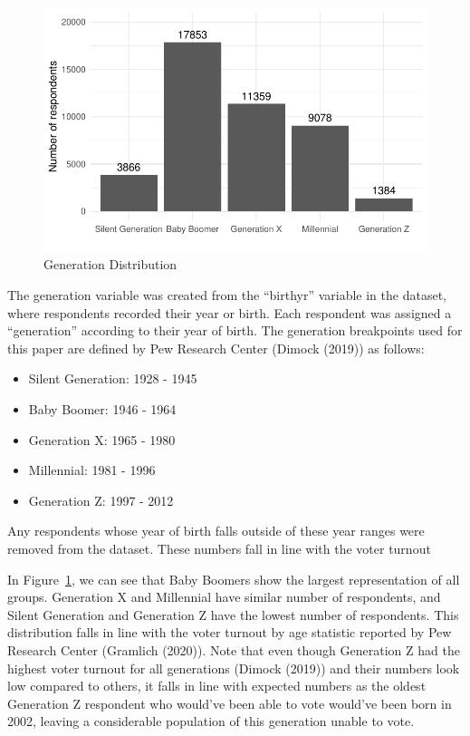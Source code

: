 \documentclass[
  letterpaper,
  DIV=11,
  numbers=noendperiod]{scrartcl}
\begin{document}
\begin{figure}

{\centering \includegraphics{paper_files/figure-pdf/fig-generation-histogram-1.pdf}

}

\caption{\label{fig-generation-histogram}Generation Distribution}

\end{figure}

The generation variable was created from the ``birthyr'' variable in the
dataset, where respondents recorded their year or birth. Each respondent
was assigned a ``generation'' according to their year of birth. The
generation breakpoints used for this paper are defined by Pew Research
Center (Dimock (2019)) as follows:

\begin{itemize}
\item
  Silent Generation: 1928 - 1945
\item
  Baby Boomer: 1946 - 1964
\item
  Generation X: 1965 - 1980
\item
  Millennial: 1981 - 1996
\item
  Generation Z: 1997 - 2012
\end{itemize}

Any respondents whose year of birth falls outside of these year ranges
were removed from the dataset. These numbers fall in line with the voter
turnout

In Figure~\ref{fig-generation-histogram}, we can see that Baby Boomers
show the largest representation of all groups. Generation X and
Millennial have similar number of respondents, and Silent Generation and
Generation Z have the lowest number of respondents. This distribution
falls in line with the voter turnout by age statistic reported by Pew
Research Center (Gramlich (2020)). Note that even though Generation Z
had the highest voter turnout for all generations (Dimock (2019)) and
their numbers look low compared to others, it falls in line with
expected numbers as the oldest Generation Z respondent who would've been
able to vote would've been born in 2002, leaving a considerable
population of this generation unable to vote.
\end{document}
